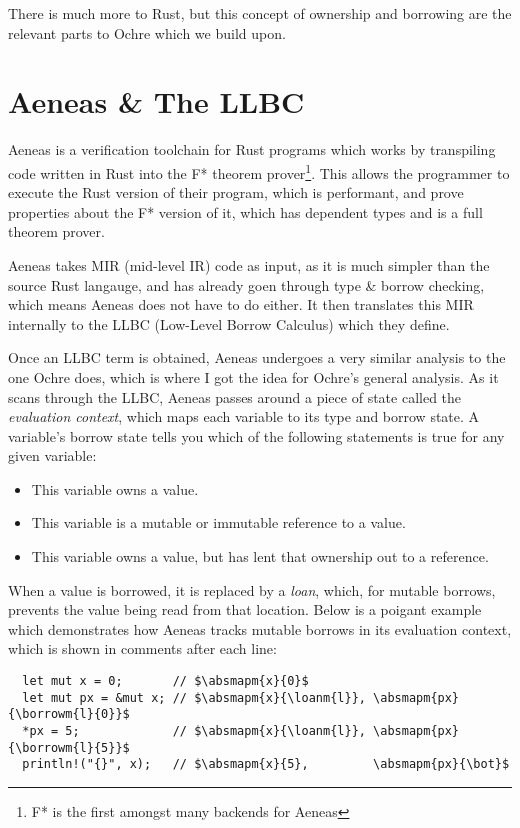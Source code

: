 \documentclass[12pt,twoside]{report}
\begin{document}
There is much more to Rust, but this concept of ownership and borrowing are the relevant parts to Ochre which we build upon.

\section{Aeneas \& The LLBC}
Aeneas \citep{aeneas} is a verification toolchain for Rust programs which works by transpiling code written in Rust into the F* theorem prover\footnote{F* is the first amongst many backends for Aeneas}. This allows the programmer to execute the Rust version of their program, which is performant, and prove properties about the F* version of it, which has dependent types and is a full theorem prover.

Aeneas takes MIR (mid-level IR) code as input, as it is much simpler than the source Rust langauge, and has already goen through type \& borrow checking, which means Aeneas does not have to do either. It then translates this MIR internally to the LLBC (Low-Level Borrow Calculus) which they define.

Once an LLBC term is obtained, Aeneas undergoes a very similar analysis to the one Ochre does, which is where I got the idea for Ochre's general analysis. As it scans through the LLBC, Aeneas passes around a piece of state called the \textit{evaluation context}, which maps each variable to its type and borrow state. A variable's borrow state tells you which of the following statements is true for any given variable:

\begin{itemize}
  \item This variable owns a value.
  \item This variable is a mutable or immutable reference to a value.
  \item This variable owns a value, but has lent that ownership out to a reference.
\end{itemize}

When a value is borrowed, it is replaced by a \textit{loan}, which, for mutable borrows, prevents the value being read from that location. Below is a poigant example which demonstrates how Aeneas tracks mutable borrows in its evaluation context, which is shown in comments after each line:

\begin{verbatim}
  let mut x = 0;       // $\absmapm{x}{0}$
  let mut px = &mut x; // $\absmapm{x}{\loanm{l}}, \absmapm{px}{\borrowm{l}{0}}$
  *px = 5;             // $\absmapm{x}{\loanm{l}}, \absmapm{px}{\borrowm{l}{5}}$
  println!("{}", x);   // $\absmapm{x}{5},         \absmapm{px}{\bot}$
\end{verbatim}
\end{document}
